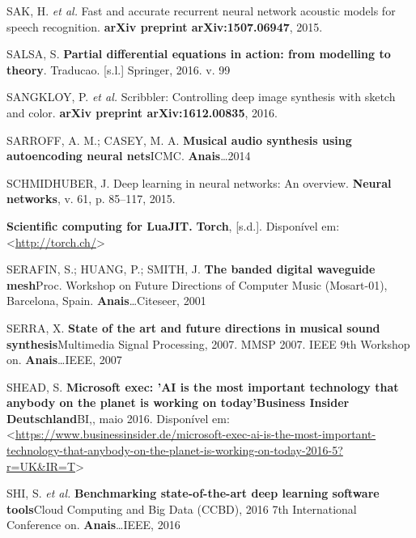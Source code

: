 \documentclass[]{article}
\begin{document}
\leavevmode\hypertarget{ref-sak2015fast}{}%
SAK, H. \emph{et al.} Fast and accurate recurrent neural network
acoustic models for speech recognition. \textbf{arXiv preprint
arXiv:1507.06947}, 2015.

\leavevmode\hypertarget{ref-salsa2016partial}{}%
SALSA, S. \textbf{Partial differential equations in action: from
modelling to theory}. Traducao. {[}s.l.{]} Springer, 2016. v. 99

\leavevmode\hypertarget{ref-sangkloy2016scribbler}{}%
SANGKLOY, P. \emph{et al.} Scribbler: Controlling deep image synthesis
with sketch and color. \textbf{arXiv preprint arXiv:1612.00835}, 2016.

\leavevmode\hypertarget{ref-sarroff2014musical}{}%
SARROFF, A. M.; CASEY, M. A. \textbf{Musical audio synthesis using
autoencoding neural nets}ICMC. \textbf{Anais}\ldots{}2014

\leavevmode\hypertarget{ref-schmidhuber2015deep}{}%
SCHMIDHUBER, J. Deep learning in neural networks: An overview.
\textbf{Neural networks}, v. 61, p. 85--117, 2015.

\leavevmode\hypertarget{ref-torch}{}%
\textbf{Scientific computing for LuaJIT.} \textbf{Torch}, {[}s.d.{]}.
Disponível em: \textless{}\url{http://torch.ch/}\textgreater{}

\leavevmode\hypertarget{ref-serafin2001banded}{}%
SERAFIN, S.; HUANG, P.; SMITH, J. \textbf{The banded digital waveguide
mesh}Proc. Workshop on Future Directions of Computer Music (Mosart-01),
Barcelona, Spain. \textbf{Anais}\ldots{}Citeseer, 2001

\leavevmode\hypertarget{ref-serra2007state}{}%
SERRA, X. \textbf{State of the art and future directions in musical
sound synthesis}Multimedia Signal Processing, 2007. MMSP 2007. IEEE 9th
Workshop on. \textbf{Anais}\ldots{}IEEE, 2007

\leavevmode\hypertarget{ref-shead_2016}{}%
SHEAD, S. \textbf{Microsoft exec: 'AI is the most important technology
that anybody on the planet is working on today'}\textbf{Business Insider
Deutschland}BI,, maio 2016. Disponível em:
\textless{}\url{https://www.businessinsider.de/microsoft-exec-ai-is-the-most-important-technology-that-anybody-on-the-planet-is-working-on-today-2016-5?r=UK\&IR=T}\textgreater{}

\leavevmode\hypertarget{ref-shi2016benchmarking}{}%
SHI, S. \emph{et al.} \textbf{Benchmarking state-of-the-art deep
learning software tools}Cloud Computing and Big Data (CCBD), 2016 7th
International Conference on. \textbf{Anais}\ldots{}IEEE, 2016
\end{document}
